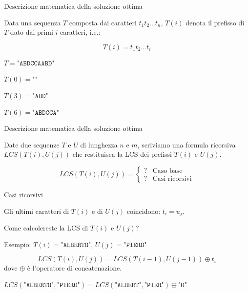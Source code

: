 \begin{frame}{Descrizione matematica della soluzione ottima}

\vspace{-9pt}
\begin{myboxtitle}
Data una sequenza $T$ composta dai caratteri $t_1t_2{\ldots}t_n$, $T(i)$ denota 
il \alert{prefisso} di $T$ dato dai primi $i$ caratteri, i.e.:

\[
  T(i) = t_1t_2{\ldots}t_i
\]
\end{myboxtitle}

\begin{myboxtitle}[Esempi]
\BIL
\item $T = \texttt{"ABDCCAABD"}$
\item $T(0) = \texttt{""}$
\item $T(3) = \texttt{"ABD"}$
\item $T(6) = \texttt{"ABDCCA"}$
\EIL
\end{myboxtitle}
\end{frame}

\begin{frame}{Descrizione matematica della soluzione ottima}

\vspace{-9pt}
\begin{myboxtitle}[Goal]
Date due sequenze $T$ e $U$ di lunghezza $n$ e $m$, scriviamo
una formula ricorsiva $LCS(T(i), U(j))$ che restituisca la LCS 
dei prefissi $T(i)$ e $U(j)$.
\end{myboxtitle}

\[
  LCS(T(i), U(j)) = \begin{cases}
   ? & \textrm{Caso base} \\
   ? & \textrm{Casi ricorsivi}
  \end{cases}
\]

\end{frame}

\begin{frame}{Casi ricorsivi}

\vspace{-9pt}

Gli ultimi caratteri di $T(i)$ e di $U(j)$ coincidono: \alert{$t_i = u_j$}. 

Come calcolereste la  LCS di $T(i)$ e $U(j)$?

\BIL
\item Esempio: $T(i)=\texttt{"ALBERTO"}$, $U(j)=\texttt{"PIERO"}$
\EIL

\pause
\bigskip
{}
\[
  LCS(T(i),U(j)) = LCS(T(i-1), U(j-1)) \oplus t_i
\]
dove $\oplus$ è l'operatore di concatenazione.

\BIL
\item $LCS(\texttt{"ALBERTO"},\texttt{"PIERO"}) = LCS(\texttt{"ALBERT"},\texttt{"PIER"}) \oplus \texttt{"O"}$
\EIL

\end{frame}

